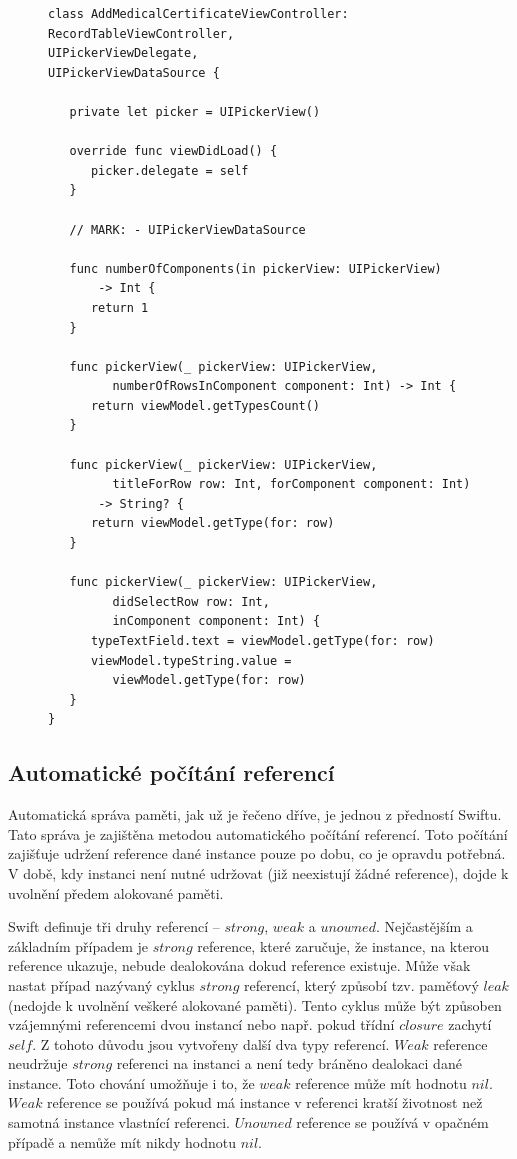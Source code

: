 \documentclass[thesis=M,czech]{FITthesis}[2012/06/26]
\begin{document}
\begin{figure}
\begin{minipage}{\linewidth}
\begin{lstlisting}[caption={Implementace protokolu},label={lst:pickerdelegate}]
class AddMedicalCertificateViewController: 
RecordTableViewController, 
UIPickerViewDelegate, 
UIPickerViewDataSource {

   private let picker = UIPickerView()

   override func viewDidLoad() {
      picker.delegate = self
   }

   // MARK: - UIPickerViewDataSource

   func numberOfComponents(in pickerView: UIPickerView) 
       -> Int {
      return 1
   }

   func pickerView(_ pickerView: UIPickerView, 
         numberOfRowsInComponent component: Int) -> Int {
      return viewModel.getTypesCount()
   }

   func pickerView(_ pickerView: UIPickerView, 
         titleForRow row: Int, forComponent component: Int)
       -> String? {
      return viewModel.getType(for: row)
   }

   func pickerView(_ pickerView: UIPickerView, 
         didSelectRow row: Int, 
         inComponent component: Int) {
      typeTextField.text = viewModel.getType(for: row)
      viewModel.typeString.value = 
         viewModel.getType(for: row)
   }
}
\end{lstlisting}
\end{minipage}
\end{figure}	
	
\subsection{Automatické počítání referencí}
Automatická správa paměti, jak už je řečeno dříve, je jednou z předností Swiftu. Tato správa je zajištěna metodou automatického počítání referencí. Toto počítání zajišťuje udržení reference dané instance pouze po dobu, co je opravdu potřebná. V době, kdy instanci není nutné udržovat (již neexistují žádné reference), dojde k uvolnění předem alokované paměti.

Swift definuje tři druhy referencí -- $strong$, $weak$ a $unowned$. Nejčastějším a základním případem je $strong$ reference, které zaručuje, že instance, na kterou reference ukazuje, nebude dealokována dokud reference existuje. Může však nastat případ nazývaný cyklus $strong$ referencí, který způsobí tzv. paměťový $leak$ (nedojde k uvolnění veškeré alokované paměti). Tento cyklus může být způsoben vzájemnými referencemi dvou instancí nebo např. pokud třídní $closure$ zachytí $self$. Z tohoto důvodu jsou vytvořeny další dva typy referencí. $Weak$ reference neudržuje $strong$ referenci na instanci a není tedy bráněno dealokaci dané instance. Toto chování umožňuje i to, že $weak$ reference může mít hodnotu $nil$. $Weak$ reference se používá pokud má instance v referenci kratší životnost než samotná instance vlastnící referenci. $Unowned$ reference se používá v opačném případě a nemůže mít nikdy hodnotu $nil$. \cite{devMemory}
	
\end{document}
